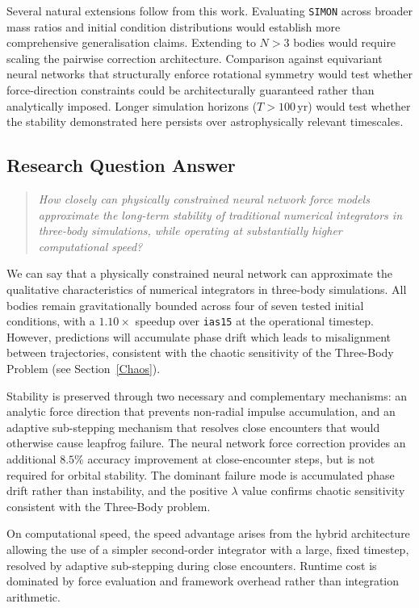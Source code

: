 \documentclass[12pt,a4paper]{article}
\newcommand{\simon}{\texttt{SIMON}}
\newcommand{\ias}{\texttt{ias15}}
\begin{document}
Several natural extensions follow from this work. Evaluating \simon{} across broader mass ratios and initial condition distributions would establish more comprehensive generalisation claims. Extending to $N > 3$ bodies would require scaling the pairwise correction architecture. Comparison against equivariant neural networks that structurally enforce rotational symmetry would test whether force-direction constraints could be architecturally guaranteed rather than analytically imposed. Longer simulation horizons ($T > 100$\,yr) would test whether the stability demonstrated here persists over astrophysically relevant timescales.

\subsection{Research Question Answer}

\begin{quote}
\emph{How closely can physically constrained neural network force models approximate the long-term stability of traditional numerical integrators in three-body simulations, while operating at substantially higher computational speed?}
\end{quote}

We can say that a physically constrained neural network can approximate the qualitative characteristics of numerical integrators in three-body simulations. All bodies remain gravitationally bounded across four of seven tested initial conditions, with a $1.10\times$ speedup over \ias{} at the operational timestep. However, predictions will accumulate phase drift which leads to misalignment between trajectories, consistent with the chaotic sensitivity of the Three-Body Problem (see Section~\ref{Chaos}).

Stability is preserved through two necessary and complementary mechanisms: an analytic force direction that prevents non-radial impulse accumulation, and an adaptive sub-stepping mechanism that resolves close encounters that would otherwise cause leapfrog failure. The neural network force correction provides an additional $8.5\%$ accuracy improvement at close-encounter steps, but is not required for orbital stability. The dominant failure mode is accumulated phase drift rather than instability, and the positive $\lambda$ value confirms chaotic sensitivity consistent with the Three-Body problem.

On computational speed, the speed advantage arises from the hybrid architecture allowing the use of a simpler second-order integrator with a large, fixed timestep, resolved by adaptive sub-stepping during close encounters. Runtime cost is dominated by force evaluation and framework overhead rather than integration arithmetic.
\end{document}
